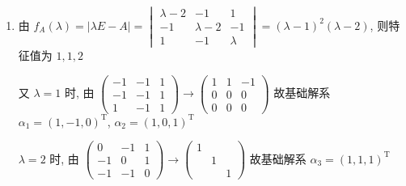      \paragraph{} %
         \begin{enumerate}
             \item %
                   由 \( f_{A}(\lambda) = |\lambda E - A| = \begin{vmatrix}
                       \lambda - 2 & -1          & 1       \\
                       -1          & \lambda - 2 & -1      \\
                       1           & -1          & \lambda
                   \end{vmatrix} = (\lambda - 1)^{2}(\lambda - 2) \), 则特征值为 \( 1, 1, 2 \)

                   又 \( \lambda = 1 \) 时, 由 \( \begin{pmatrix}
                       -1 & -1 & 1 \\
                       -1 & -1 & 1 \\
                       1  & -1 & 1
                   \end{pmatrix} \rightarrow \begin{pmatrix}
                       1 & 1 & -1 \\
                       0 & 0 & 0  \\
                       0 & 0 & 0
                   \end{pmatrix} \) 故基础解系 \( \alpha_{1} = (1, -1, 0)^{\mathrm{T}} \), \( \alpha_{2} = (1, 0, 1)^{\mathrm{T}} \)

                   \( \lambda = 2 \) 时, 由 \( \begin{pmatrix}
                       0  & -1 & 1 \\
                       -1 & 0  & 1 \\
                       -1 & -1 & 0
                   \end{pmatrix} \rightarrow \begin{pmatrix}
                       1 &   &   \\
                         & 1 &   \\
                         &   & 1
                   \end{pmatrix} \) 故基础解系 \( \alpha_{3} = (1, 1, 1)^{\mathrm{T}} \)


\end{enumerate}
